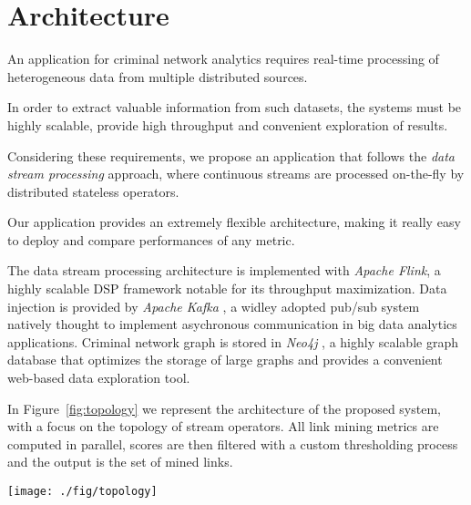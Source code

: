 \section{Architecture}
\label{sec:architecture}

An application for criminal network analytics requires real-time processing of heterogeneous data from multiple distributed sources.

In order to extract valuable information from such datasets, the systems must be highly scalable, provide high throughput and convenient exploration of results.

Considering these requirements, we propose an application that follows the \textit{data stream processing} approach, where continuous streams are processed on-the-fly by distributed stateless operators.

Our application provides an extremely flexible architecture, making it really easy to deploy and compare performances of any metric.

The data stream processing architecture is implemented with \textit{Apache Flink}\cite{flink}, a highly scalable DSP framework notable for its throughput maximization.
Data injection is provided by \textit{Apache Kafka} \cite{kafka}, a widley adopted pub/sub system natively thought to implement asychronous communication in big data analytics applications.
Criminal network graph is stored in \textit{Neo4j} \cite{neo4j}, a highly scalable graph database that optimizes the storage of large graphs and provides a convenient web-based data exploration tool.

In Figure~\ref{fig:topology} we represent the architecture of the proposed system, with a focus on the topology of stream operators. All link mining metrics are computed in parallel, scores are then filtered with a custom thresholding process and the output is the set of mined links.

\begin{figure*}
\centering
\texttt{[image: ./fig/topology]}
\caption{The architecture.}
\label{fig:topology}
\end{figure*}


